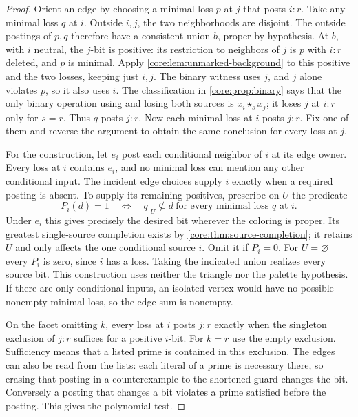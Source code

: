 \begin{proof}
Orient an edge by choosing a minimal loss $p$ at $j$ that posts
$i:r$. Take any minimal loss $q$ at $i$. Outside $i,j$, the two
neighborhoods are disjoint. The outside postings of $p,q$ therefore
have a consistent union $b$, proper by hypothesis. At $b$, with
$i$ neutral, the $j$-bit is positive: its restriction to neighbors
of $j$ is $p$ with $i:r$ deleted, and $p$ is minimal.
Apply \cref{core:lem:unmarked-background} to this positive and the
two losses, keeping just $i,j$. The binary witness uses $j$, and
$j$ alone violates $p$, so it also uses $i$. The classification
in \cref{core:prop:binary} says that the only binary operation
using and losing both sources is $x_i\star_s x_j$; it loses $j$
at $i:r$ only for $s=r$. Thus $q$ posts $j:r$. Now each minimal
loss at $i$ posts $j:r$. Fix one of them and reverse the argument
to obtain the same conclusion for every loss at $j$.

For the construction, let $e_i$ post each conditional neighbor of
$i$ at its edge owner. Every loss at $i$ contains $e_i$, and no
minimal loss can mention any other conditional input. The incident
edge choices supply $i$ exactly when a required posting is absent.
To supply its remaining positives, prescribe on $U$ the predicate
\[
       P_i(d)=1\quad\Longleftrightarrow\quad
       q|_U\not\subseteq d\ \text{for every minimal loss $q$ at $i$}.
\]
Under $e_i$ this gives precisely the desired bit wherever the
coloring is proper. Its greatest single-source completion exists
by \cref{core:thm:source-completion}; it retains $U$ and only
affects the one conditional source $i$. Omit it if $P_i=0$.
For $U=\varnothing$ every $P_i$ is zero, since $i$ has a loss.
Taking the indicated union realizes every source bit. This construction
uses neither the triangle nor the palette hypothesis. If there are
only conditional inputs, an isolated vertex would have no possible
nonempty minimal loss, so the edge sum is nonempty.

On the facet omitting $k$, every loss at $i$ posts $j:r$ exactly
when the singleton exclusion of $j:r$ suffices for a positive
$i$-bit. For $k=r$ use the empty exclusion. Sufficiency means that
a listed prime is contained in this exclusion. The edges can also
be read from the lists: each literal of a prime is necessary there,
so erasing that posting in a counterexample to the shortened guard
changes the bit. Conversely a posting that changes a bit violates
a prime satisfied before the posting. This gives the polynomial test.
\end{proof}

